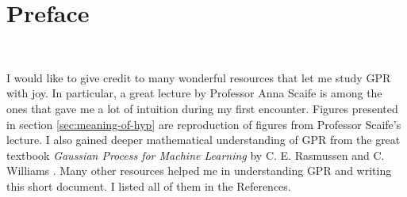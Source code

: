 \documentclass[10pt,twocolumn]{article}
\begin{document}


\vspace{10mm}

\setlength{\parindent}{0cm}

\fontsize{14}{10}\selectfont {Kamila Zdybał}

\vspace{2mm}

\fontsize{8}{10}

\section*{Preface}

\,\,

I would like to give credit to many wonderful resources that let me study GPR with joy. In particular, a great lecture by Professor Anna Scaife \cite{Scaife} is among the ones that gave me a lot of intuition during my first encounter. Figures presented in section \ref{sec:meaning-of-hyp} are reproduction of figures from Professor Scaife's lecture. I also gained deeper mathematical understanding of GPR from the great textbook \textit{Gaussian Process for Machine Learning} by C. E. Rasmussen and C. Williams \cite{Rasmussen}. Many other resources helped me in understanding GPR and writing this short document. I listed all of them in the References.
\end{document}
